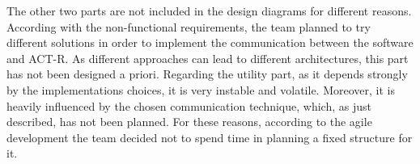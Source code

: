 	

	The other two parts are not included in the design diagrams for different reasons. 
	According with the non-functional requirements, the team planned to try different solutions in order to implement the communication between the software and ACT-R. As different approaches can lead to different architectures, this part has not been designed a priori.
	Regarding the utility part, as it depends strongly by the implementations choices, it is very instable and volatile. Moreover, it is heavily influenced by the chosen communication technique, which, as just described, has not been planned.
	For these reasons, according to the agile development the team decided not to spend time in planning a fixed structure for it.
	
	
	

